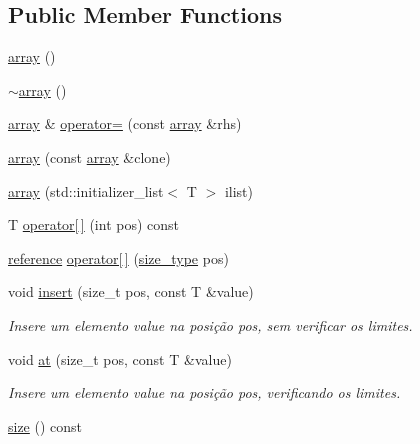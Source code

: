 \subsection*{Public Member Functions}
\begin{DoxyCompactItemize}
\item 
\hyperlink{classsc_1_1array_aa252df95ea94ad054efe2861d830de91}{array} ()
\item 
\hyperlink{classsc_1_1array_a291846a1b0777313c28f0c259e68e19f}{$\sim$array} ()
\item 
\hyperlink{classsc_1_1array}{array} \& \hyperlink{classsc_1_1array_acc56f3049e57cc6cddb56ab544319a56}{operator=} (const \hyperlink{classsc_1_1array}{array} \&rhs)
\item 
\hyperlink{classsc_1_1array_a2bed3ac7be339da876fbcff64e5ca6c4}{array} (const \hyperlink{classsc_1_1array}{array} \&clone)
\item 
\hyperlink{classsc_1_1array_a48f911993c1804c9d7acc8c1cbca6b43}{array} (std\+::initializer\+\_\+list$<$ T $>$ ilist)
\item 
T \hyperlink{classsc_1_1array_a2d56c1df2b2490f60a974884fdbf8601}{operator\mbox{[}$\,$\mbox{]}} (int pos) const
\item 
\hyperlink{classsc_1_1array_ae7d6903e3e7b850083c836e5061ac785}{reference} \hyperlink{classsc_1_1array_ae786a2893dd8f5290d6c4a3e1ac0cbcf}{operator\mbox{[}$\,$\mbox{]}} (\hyperlink{classsc_1_1array_a6358115a468f72263895bbb17c924718}{size\+\_\+type} pos)
\item 
void \hyperlink{classsc_1_1array_ad17dd82a32680d0fae3cb6922bb57150}{insert} (size\+\_\+t pos, const T \&value)
\begin{DoxyCompactList}\small\item\em Insere um elemento \textquotesingle{}value\textquotesingle{} na posição \textquotesingle{}pos\textquotesingle{}, sem verificar os limites. \end{DoxyCompactList}\item 
void \hyperlink{classsc_1_1array_a00b156f242da8caa5c30625b5e678336}{at} (size\+\_\+t pos, const T \&value)
\begin{DoxyCompactList}\small\item\em Insere um elemento \textquotesingle{}value\textquotesingle{} na posição \textquotesingle{}pos\textquotesingle{}, verificando os limites. \end{DoxyCompactList}\item 
\hyperlink{classsc_1_1array_ac2a3102edfe1445b57a2004585ce8dcf}{size} () const
\item 

\end{DoxyCompactItemize}
